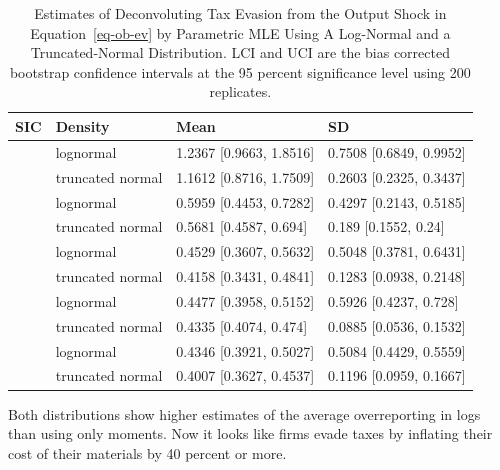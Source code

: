 \documentclass[
  12pt]{article}
\theoremstyle{definition}
\theoremstyle{remark}
\begin{document}
\begin{longtable}[t]{llll}

\caption{\label{tbl-deconv-mle-boot}Estimates of Deconvoluting Tax
Evasion from the Output Shock in Equation~\ref{eq-ob-ev} by Parametric
MLE Using A Log-Normal and a Truncated-Normal Distribution. LCI and UCI
are the bias corrected bootstrap confidence intervals at the 95 percent
significance level using 200 replicates.}

\tabularnewline

\toprule
SIC & Density & Mean & SD\\
\midrule
 & lognormal & 1.2367 [0.9663, 1.8516] & 0.7508 [0.6849, 0.9952]\\
\cmidrule{2-4}\nopagebreak
\multirow[t]{-2}{*}{\raggedright\arraybackslash 322} & truncated normal & 1.1612 [0.8716, 1.7509] & 0.2603 [0.2325, 0.3437]\\
\cmidrule{1-4}\pagebreak[0]
 & lognormal & 0.5959 [0.4453, 0.7282] & 0.4297 [0.2143, 0.5185]\\
\cmidrule{2-4}\nopagebreak
\multirow[t]{-2}{*}{\raggedright\arraybackslash 351} & truncated normal & 0.5681 [0.4587, 0.694] & 0.189 [0.1552, 0.24]\\
\cmidrule{1-4}\pagebreak[0]
 & lognormal & 0.4529 [0.3607, 0.5632] & 0.5048 [0.3781, 0.6431]\\
\cmidrule{2-4}\nopagebreak
\multirow[t]{-2}{*}{\raggedright\arraybackslash 331} & truncated normal & 0.4158 [0.3431, 0.4841] & 0.1283 [0.0938, 0.2148]\\
\cmidrule{1-4}\pagebreak[0]
 & lognormal & 0.4477 [0.3958, 0.5152] & 0.5926 [0.4237, 0.728]\\
\cmidrule{2-4}\nopagebreak
\multirow[t]{-2}{*}{\raggedright\arraybackslash 313} & truncated normal & 0.4335 [0.4074, 0.474] & 0.0885 [0.0536, 0.1532]\\
\cmidrule{1-4}\pagebreak[0]
 & lognormal & 0.4346 [0.3921, 0.5027] & 0.5084 [0.4429, 0.5559]\\
\cmidrule{2-4}\nopagebreak
\multirow[t]{-2}{*}{\raggedright\arraybackslash 342} & truncated normal & 0.4007 [0.3627, 0.4537] & 0.1196 [0.0959, 0.1667]\\
\bottomrule

\end{longtable}

Both distributions show higher estimates of the average overreporting in
logs than using only moments. Now it looks like firms evade taxes by
inflating their cost of their materials by 40 percent or more.
\end{document}

